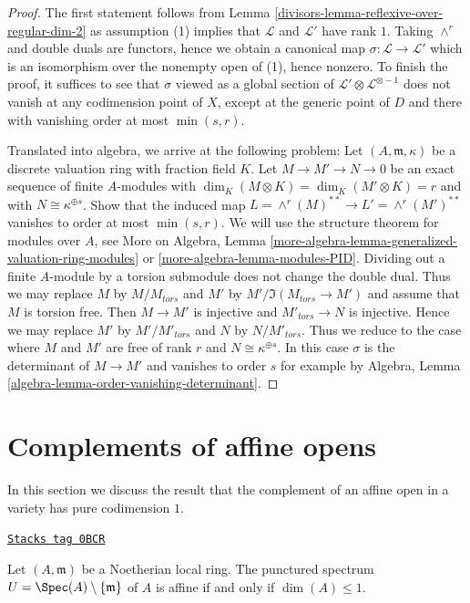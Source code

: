 \begin{proof}

The first statement follows from Lemma \ref{divisors-lemma-reflexive-over-regular-dim-2}
as assumption (1) implies that $\mathcal{L}$ and $\mathcal{L}'$
have rank $1$. Taking $\wedge^r$ and double duals are functors, hence
we obtain a canonical map $\sigma : \mathcal{L} \to \mathcal{L}'$
which is an isomorphism over the nonempty open of (1), hence
nonzero. To finish the proof, it suffices to see that
$\sigma$ viewed as a global section of
$\mathcal{L}' \otimes \mathcal{L}^{\otimes -1}$ does not
vanish at any codimension point of $X$, except at the generic
point of $D$ and there with vanishing order at most $\min(s, r)$.

\medskip\noindent
Translated into algebra, we arrive at the following problem:
Let $(A, \mathfrak m, \kappa)$ be a discrete valuation ring
with fraction field $K$. Let $M \to M' \to N \to 0$ be an exact sequence
of finite $A$-modules with $\dim_K(M \otimes K) = \dim_K(M' \otimes K) = r$
and with $N \cong \kappa^{\oplus s}$. Show that the induced map
$L = \wedge^r(M)^{**} \to L' = \wedge^r(M')^{**}$ vanishes to
order at most $\min(s, r)$. We will use the structure theorem for
modules over $A$, see
More on Algebra, Lemma
\ref{more-algebra-lemma-generalized-valuation-ring-modules} or
\ref{more-algebra-lemma-modules-PID}.
Dividing out a finite $A$-module by a torsion submodule does not
change the double dual.
Thus we may replace $M$ by $M/M_{tors}$ and $M'$ by
$M'/\Im(M_{tors} \to M')$ and assume that $M$ is torsion free.
Then $M \to M'$ is injective and $M'_{tors} \to N$ is injective.
Hence we may replace $M'$ by $M'/M'_{tors}$ and $N$ by $N/M'_{tors}$.
Thus we reduce to the case where $M$ and $M'$ are free of rank $r$
and $N \cong \kappa^{\oplus s}$. In this case $\sigma$
is the determinant of $M \to M'$ and vanishes to order $s$
for example by Algebra, Lemma \ref{algebra-lemma-order-vanishing-determinant}.
\end{proof}

\section{Complements of affine opens}
\label{divisors-section-complement-affine-open}
In this section we discuss the result that the complement of an
affine open in a variety has pure codimension $1$.

\begin{lemma}
\label{divisors-lemma-affine-punctured-spec}
\href{https://stacks.math.columbia.edu/tag/0BCR}{\texttt{Stacks tag 0BCR}}

Let $(A, \mathfrak m)$ be a Noetherian local ring.
The punctured spectrum $U = \Spec(A) \setminus \{\mathfrak m\}$
of $A$ is affine if and only if $\dim(A) \leq 1$.
\end{lemma}


